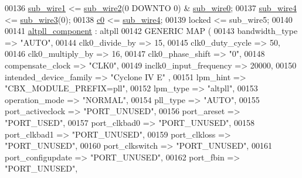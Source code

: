 \begin{DoxyCode}
{00136     \textcolor{vhdlchar}{\hyperlink{classpll_1_1_s_y_n_a325f96af17ccfcff0f437d73da993aff}{sub\_wire1}}    \textcolor{vhdlchar}{<=} \textcolor{vhdlchar}{\hyperlink{classpll_1_1_s_y_n_a205f2292eed10dd71c2a24fab09e93ae}{sub\_wire2}}\textcolor{vhdlchar}{(}\textcolor{vhdllogic}{}\textcolor{vhdllogic}{0} \textcolor{keywordflow}{DOWNTO} \textcolor{vhdllogic}{}\textcolor{vhdllogic}{0}\textcolor{vhdlchar}{)} \textcolor{vhdlchar}{&} \textcolor{vhdlchar}{\hyperlink{classpll_1_1_s_y_n_aca40f2d2e88330e7729fc8f89d1e2366}{sub\_wire0}};
00137     \textcolor{vhdlchar}{\hyperlink{classpll_1_1_s_y_n_a1743b96eadf0499d106535e1a9241b2a}{sub\_wire4}}    \textcolor{vhdlchar}{<=} \textcolor{vhdlchar}{\hyperlink{classpll_1_1_s_y_n_adf9c19689a8299f2f295de58153514e4}{sub\_wire3}}\textcolor{vhdlchar}{(}\textcolor{vhdllogic}{}\textcolor{vhdllogic}{0}\textcolor{vhdlchar}{)};
00138     \textcolor{vhdlchar}{\hyperlink{classpll_abbf54d96b104435e8cbaadcf0e9184bd}{c0}}    \textcolor{vhdlchar}{<=} \textcolor{vhdlchar}{\hyperlink{classpll_1_1_s_y_n_a1743b96eadf0499d106535e1a9241b2a}{sub\_wire4}};
00139     locked    <= sub\_wire5;
00140 
00141     \hyperlink{classpll_1_1_s_y_n_a70fc906d546df6812934a5430ac231a3}{altpll\_component} : altpll
00142     \textcolor{keywordflow}{GENERIC} \textcolor{keywordflow}{MAP} (
00143         bandwidth\_type => \textcolor{keyword}{"AUTO"},
00144         clk0\_divide\_by => \textcolor{vhdllogic}{15},
00145         clk0\_duty\_cycle => \textcolor{vhdllogic}{50},
00146         clk0\_multiply\_by => \textcolor{vhdllogic}{16},
00147         clk0\_phase\_shift => "\textcolor{vhdllogic}{0}",
00148         compensate\_clock => \textcolor{keyword}{"CLK0"},
00149         inclk0\_input\_frequency => \textcolor{vhdllogic}{20000},
00150         intended\_device\_family => \textcolor{keyword}{"Cyclone IV E"}  ,
00151         lpm\_hint => \textcolor{keyword}{"CBX\_MODULE\_PREFIX=pll"},
00152         lpm\_type => \textcolor{keyword}{"altpll"},
00153         operation\_mode => \textcolor{keyword}{"NORMAL"},
00154         pll\_type => \textcolor{keyword}{"AUTO"},
00155         port\_activeclock => \textcolor{keyword}{"PORT\_UNUSED"},
00156         port\_areset => \textcolor{keyword}{"PORT\_USED"},
00157         port\_clkbad0 => \textcolor{keyword}{"PORT\_UNUSED"},
00158         port\_clkbad1 => \textcolor{keyword}{"PORT\_UNUSED"},
00159         port\_clkloss => \textcolor{keyword}{"PORT\_UNUSED"},
00160         port\_clkswitch => \textcolor{keyword}{"PORT\_UNUSED"},
00161         port\_configupdate => \textcolor{keyword}{"PORT\_UNUSED"},
00162         port\_fbin => \textcolor{keyword}{"PORT\_UNUSED"},
}
\end{DoxyCode}
